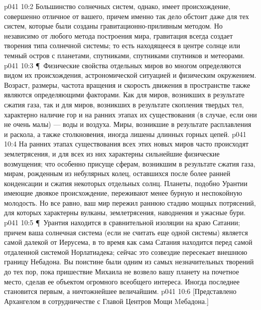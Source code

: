 \vs p041 10:2 Большинство солнечных систем, однако, имеет происхождение, совершенно отличное от вашего, причем именно так дело обстоит даже для тех систем, которые были созданы гравитационно\hyp{}приливным методом. Но независимо от любого метода построения мира, гравитация всегда создает творения типа солнечной системы; то есть находящееся в центре солнце или темный остров с планетами, спутниками, спутниками спутников и метеорами.
\vs p041 10:3 \P\ Физические свойства отдельных миров во многом определяются видом их происхождения, астрономической ситуацией и физическим окружением. Возраст, размеры, частота вращения и скорость движения в пространстве также являются определяющими факторами. Как для миров, возникших в результате сжатия газа, так и для миров, возникших в результате скопления твердых тел, характерно наличие гор и на ранних этапах их существования (в случае, если они не очень малы) --- воды и воздуха. Миры, возникшие в результате расплавления и раскола, а также столкновения, иногда лишены длинных горных цепей.
\vs p041 10:4 На ранних этапах существования всех этих новых миров часто происходят землетрясения, и для всех из них характерны сильнейшие физические возмущения; что особенно присуще сферам, возникшим в результате сжатия газа, мирам, рожденным из небулярных колец, оставшихся после более ранней конденсации и сжатия некоторых отдельных солнц. Планеты, подобно Урантии имеющие двоякое происхождение, переживают менее бурную и неспокойную молодость. Но все равно, ваш мир пережил раннюю стадию мощных потрясений, для которых характерны вулканы, землетрясения, наводнения и ужасные бури.
\vs p041 10:5 \P\ Урантия находится в сравнительной изоляции на краю Сатании; причем ваша солнечная система (если не считать еще одной системы) является самой далекой от Иерусема, в то время как сама Сатания находится перед самой отдаленной системой Норлатиадека; сейчас это созвездие пересекает внешнюю границу Небадона. Вы поистине были одним из самых незначительных творений до тех пор, пока пришествие Михаила не возвело вашу планету на почетное место, сделав ее объектом огромного всеобщего интереса. Иногда последнее становится первым, а ничтожнейшее величайшим.
\vs p041 10:6 [Представлено Архангелом в сотрудничестве с Главой Центров Мощи Mебадона.]
